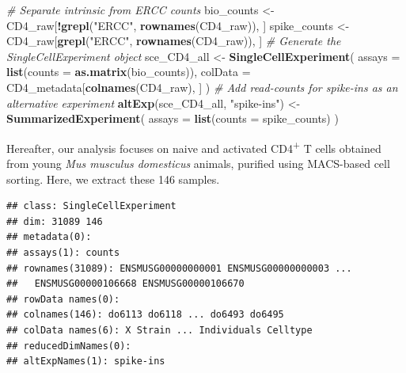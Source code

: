 \documentclass[9pt,a4paper,]{extarticle}
\newenvironment{Shaded}{\begin{snugshade}}{\end{snugshade}}
\newcommand{\CommentTok}[1]{\textcolor[rgb]{0.56,0.35,0.01}{\textit{#1}}}
\newcommand{\DataTypeTok}[1]{\textcolor[rgb]{0.13,0.29,0.53}{#1}}
\newcommand{\KeywordTok}[1]{\textcolor[rgb]{0.13,0.29,0.53}{\textbf{#1}}}
\newcommand{\NormalTok}[1]{#1}
\newcommand{\OperatorTok}[1]{\textcolor[rgb]{0.81,0.36,0.00}{\textbf{#1}}}
\newcommand{\StringTok}[1]{\textcolor[rgb]{0.31,0.60,0.02}{#1}}
\begin{document}
\begin{Shaded}
\begin{Highlighting}[]
\CommentTok{# Separate intrinsic from ERCC counts}
\NormalTok{bio_counts <-}\StringTok{ }\NormalTok{CD4_raw[}\OperatorTok{!}\KeywordTok{grepl}\NormalTok{(}\StringTok{"ERCC"}\NormalTok{, }\KeywordTok{rownames}\NormalTok{(CD4_raw)), ]}
\NormalTok{spike_counts <-}\StringTok{ }\NormalTok{CD4_raw[}\KeywordTok{grepl}\NormalTok{(}\StringTok{"ERCC"}\NormalTok{, }\KeywordTok{rownames}\NormalTok{(CD4_raw)), ]}
\CommentTok{# Generate the SingleCellExperiment object}
\NormalTok{sce_CD4_all <-}\StringTok{ }\KeywordTok{SingleCellExperiment}\NormalTok{(}
  \DataTypeTok{assays =} \KeywordTok{list}\NormalTok{(}\DataTypeTok{counts =} \KeywordTok{as.matrix}\NormalTok{(bio_counts)),}
  \DataTypeTok{colData =}\NormalTok{ CD4_metadata[}\KeywordTok{colnames}\NormalTok{(CD4_raw), ]}
\NormalTok{)}
\CommentTok{# Add read-counts for spike-ins as an alternative experiment}
\KeywordTok{altExp}\NormalTok{(sce_CD4_all, }\StringTok{"spike-ins"}\NormalTok{) <-}\StringTok{ }\KeywordTok{SummarizedExperiment}\NormalTok{(}
  \DataTypeTok{assays =} \KeywordTok{list}\NormalTok{(}\DataTypeTok{counts =}\NormalTok{ spike_counts)}
\NormalTok{)}
\end{Highlighting}
\end{Shaded}

Hereafter, our analysis focuses on naive and activated CD4\textsuperscript{+} T cells obtained
from young \emph{Mus musculus domesticus} animals, purified using MACS-based cell sorting.
Here, we extract these
146 samples.

\begin{Shaded}
\end{Shaded}

\begin{verbatim}
## class: SingleCellExperiment 
## dim: 31089 146 
## metadata(0):
## assays(1): counts
## rownames(31089): ENSMUSG00000000001 ENSMUSG00000000003 ...
##   ENSMUSG00000106668 ENSMUSG00000106670
## rowData names(0):
## colnames(146): do6113 do6118 ... do6493 do6495
## colData names(6): X Strain ... Individuals Celltype
## reducedDimNames(0):
## altExpNames(1): spike-ins
\end{verbatim}
\end{document}

